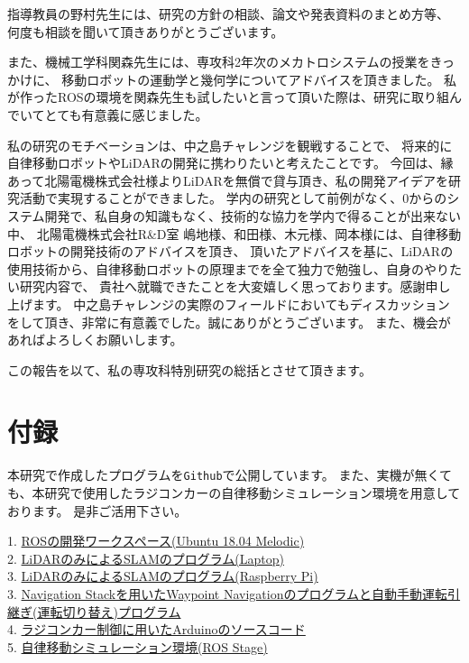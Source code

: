 \documentclass[a4paper,12pt]{jreport}
\begin{document}
指導教員の野村先生には、研究の方針の相談、論文や発表資料のまとめ方等、
何度も相談を聞いて頂きありがとうございます。

また、機械工学科関森先生には、専攻科2年次のメカトロシステムの授業をきっかけに、
移動ロボットの運動学と幾何学についてアドバイスを頂きました。
私が作ったROSの環境を関森先生も試したいと言って頂いた際は、研究に取り組んでいてとても有意義に感じました。

私の研究のモチベーションは、中之島チャレンジを観戦することで、
将来的に自律移動ロボットやLiDARの開発に携わりたいと考えたことです。
今回は、縁あって北陽電機株式会社様よりLiDARを無償で貸与頂き、私の開発アイデアを研究活動で実現することができました。
学内の研究として前例がなく、0からのシステム開発で、私自身の知識もなく、技術的な協力を学内で得ることが出来ない中、
北陽電機株式会社R\&D室 嶋地様、和田様、木元様、岡本様には、自律移動ロボットの開発技術のアドバイスを頂き、
頂いたアドバイスを基に、LiDARの使用技術から、自律移動ロボットの原理までを全て独力で勉強し、自身のやりたい研究内容で、
貴社へ就職できたことを大変嬉しく思っております。感謝申し上げます。
中之島チャレンジの実際のフィールドにおいてもディスカッションをして頂き、非常に有意義でした。誠にありがとうございます。
また、機会があればよろしくお願いします。

この報告を以て、私の専攻科特別研究の総括とさせて頂きます。

\appendix
\chapter*{付録}
本研究で作成したプログラムを\verb|Github|で公開しています。
また、実機が無くても、本研究で使用したラジコンカーの自律移動シミュレーション環境を用意しております。
是非ご活用下さい。

\begin{screen}
1. \href{https://github.com/meijinn/catkin_ws}{ROSの開発ワークスペース(Ubuntu 18.04 Melodic)}\\
2. \href{https://github.com/meijinn/catkin_ws/tree/master/src/urg_gmapping}{LiDARのみによるSLAMのプログラム(Laptop)}\\
3. \href{https://github.com/meijinn/raspi_ros/blob/master/src/raspi_node/launch/urg_remote_robot.launch}{LiDARのみによるSLAMのプログラム(Raspberry Pi)}\\
3. \href{https://github.com/meijinn/catkin_ws/blob/master/src/urg_gmapping/launch/amcl_navigation.launch}{Navigation Stackを用いたWaypoint Navigationのプログラムと自動手動運転引継ぎ(運転切り替え)プログラム}\\
4. \href{https://github.com/meijinn/catkin_ws/blob/master/Arduino_ws/motor/motor.ino}{ラジコンカー制御に用いたArduinoのソースコード}\\
5. \href{https://github.com/meijinn/catkin_ws/tree/master/src/tamiya_teb_stage}{自律移動シミュレーション環境(ROS Stage)}
\end{screen}
\end{document}
